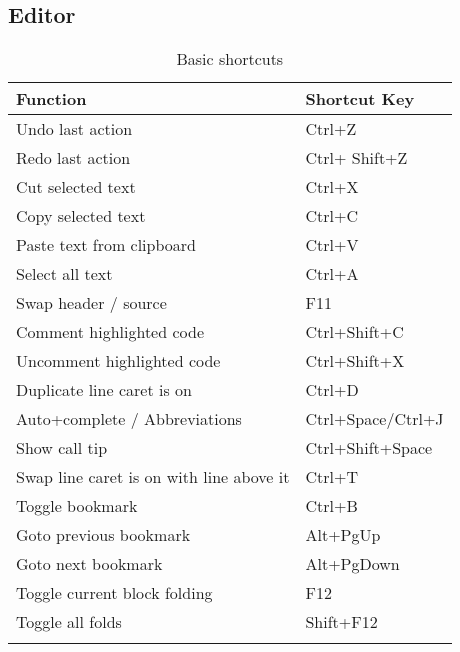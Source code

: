 \subsection{Editor}

{\small
\begin{longtable}{|l|l|}\hline
\textbf{Function}		                    &   \textbf{Shortcut Key}   \\ \hline
\endhead   %
Undo last action 	                        &   Ctrl+Z                  \\ \hline
Redo last action 	                        &   Ctrl+ Shift+Z           \\ \hline
Cut selected text                           &   Ctrl+X                  \\ \hline
Copy selected text                          &   Ctrl+C                  \\ \hline
Paste text from clipboard                   &   Ctrl+V                  \\ \hline
Select all text                             &   Ctrl+A                  \\ \hline
Swap header / source 	                    &	F11                     \\ \hline
Comment highlighted code                    &	Ctrl+Shift+C            \\ \hline
Uncomment highlighted code                  & 	Ctrl+Shift+X            \\ \hline
Duplicate line caret is on                  & 	Ctrl+D                  \\ \hline
Auto+complete / Abbreviations               & 	Ctrl+Space/Ctrl+J       \\ \hline
Show call tip 	                            &	Ctrl+Shift+Space        \\ \hline
Swap line caret is on with line above it    &	Ctrl+T                  \\ \hline
Toggle bookmark 	                        &	Ctrl+B                  \\ \hline
Goto previous bookmark 	                    &	Alt+PgUp                \\ \hline
Goto next bookmark 	                        &	Alt+PgDown              \\ \hline
Toggle current block folding 	            &	F12                     \\ \hline
Toggle all folds 	                        &	Shift+F12               \\ \hline
\caption{Basic shortcuts}
\end{longtable}
}

